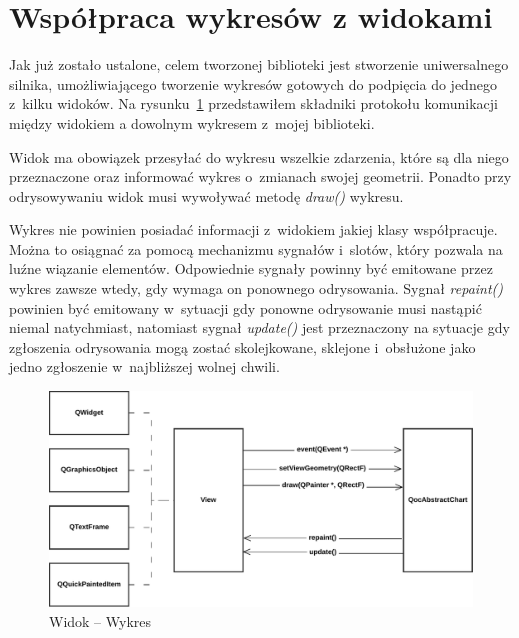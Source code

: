 \section{Współpraca wykresów z widokami }
Jak już zostało ustalone, celem tworzonej biblioteki jest stworzenie uniwersalnego silnika, umożliwiającego tworzenie wykresów gotowych do podpięcia do jednego z~kilku widoków. Na rysunku~\ref{rys:widok:wykres} przedstawiłem składniki protokołu komunikacji między widokiem a dowolnym wykresem z~mojej biblioteki.

Widok ma obowiązek przesyłać do wykresu wszelkie zdarzenia, które są dla niego przeznaczone oraz informować wykres o~zmianach swojej geometrii. Ponadto przy odrysowywaniu widok musi wywoływać metodę \textit{draw()} wykresu.

Wykres nie powinien posiadać informacji z~widokiem jakiej klasy współpracuje. Można to osiągnać za pomocą mechanizmu sygnałów i~slotów, który pozwala na luźne wiązanie elementów. Odpowiednie sygnały  powinny być emitowane przez wykres zawsze wtedy, gdy wymaga on ponownego odrysowania.
Sygnał \textit{repaint()} powinien być emitowany w~sytuacji gdy ponowne odrysowanie musi nastąpić niemal natychmiast, natomiast sygnał \textit{update()} jest przeznaczony na sytuacje gdy zgłoszenia odrysowania mogą zostać skolejkowane, sklejone i~obsłużone jako jedno zgłoszenie w~najbliższej wolnej chwili.


\begin{figure}
\centering
\caption{Widok -- Wykres}\label{rys:widok:wykres}
\includegraphics[scale=0.75]{img/widok-wykres.pdf}
\end{figure}



